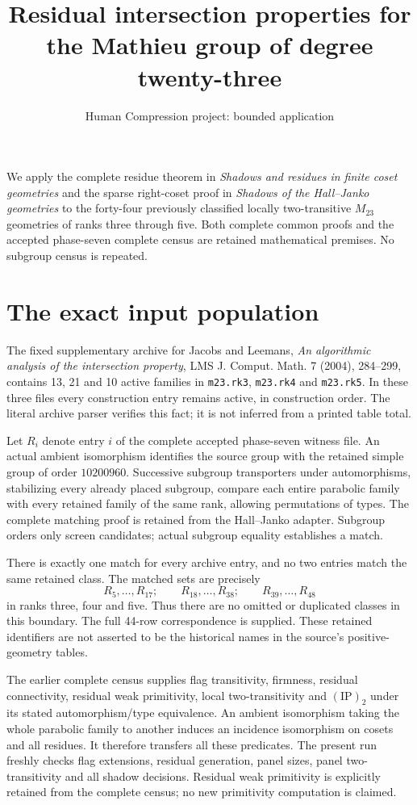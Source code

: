 \documentclass[11pt,a4paper]{article}
\title{Residual intersection properties for the Mathieu group of degree twenty-three}
\author{Human Compression project: bounded application}\date{}
\begin{document}
\maketitle
We apply the complete residue theorem in \emph{Shadows and residues in
finite coset geometries} and the sparse right-coset proof in \emph{Shadows
of the Hall--Janko geometries} to the forty-four previously classified
locally two-transitive $M_{23}$ geometries of ranks three through five.
Both complete common proofs and the accepted phase-seven complete census
are retained mathematical premises. No subgroup census is repeated.

\section{The exact input population}
The fixed supplementary archive for Jacobs and Leemans, \emph{An algorithmic
analysis of the intersection property}, LMS J. Comput. Math. 7 (2004),
284--299, contains 13, 21 and 10 active families in \texttt{m23.rk3},
\texttt{m23.rk4} and \texttt{m23.rk5}. In these three files every construction
entry remains active, in construction order. The literal archive parser
verifies this fact; it is not inferred from a printed table total.

Let $R_i$ denote entry $i$ of the complete accepted phase-seven witness
file. An actual ambient isomorphism identifies the source group with the
retained simple group of order $10200960$. Successive subgroup transporters
under automorphisms, stabilizing every already placed subgroup, compare
each entire parabolic family with every retained family of the same rank,
allowing permutations of types. The complete matching proof is retained
from the Hall--Janko adapter. Subgroup orders only screen candidates;
actual subgroup equality establishes a match.

There is exactly one match for every archive entry, and no two entries
match the same retained class. The matched sets are precisely
\[
 R_5,\ldots,R_{17};\qquad R_{18},\ldots,R_{38};\qquad R_{39},\ldots,R_{48}
\]
in ranks three, four and five. Thus there are no omitted or duplicated
classes in this boundary. The full 44-row correspondence is supplied.
These retained identifiers are not asserted to be the historical names
in the source's positive-geometry tables.

The earlier complete census supplies flag transitivity, firmness,
residual connectivity, residual weak primitivity, local two-transitivity
and $(\mathrm{IP})_2$ under its stated automorphism/type equivalence.
An ambient isomorphism taking the whole parabolic family to another
induces an incidence isomorphism on cosets and all residues. It therefore
transfers all these predicates. The present run freshly checks flag
extensions, residual generation, panel sizes, panel two-transitivity and
all shadow decisions. Residual weak primitivity is explicitly retained
from the complete census; no new primitivity computation is claimed.
\end{document}
